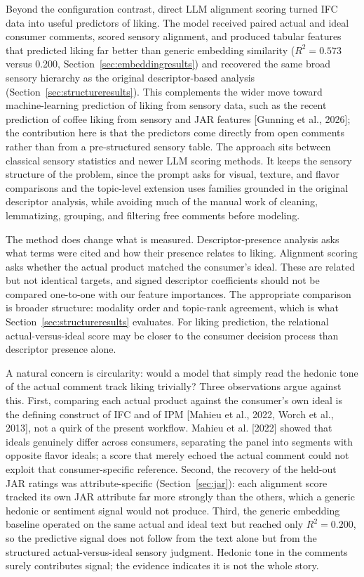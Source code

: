 \documentclass[11pt]{article}
\begin{document}
Beyond the configuration contrast, direct LLM alignment scoring turned IFC
data into useful predictors of liking. The model received paired actual and
ideal consumer comments, scored sensory alignment, and produced tabular
features that predicted liking far better than generic embedding similarity
($R^2 = 0.573$ versus 0.200, Section~\ref{sec:embeddingresults}) and recovered
the same broad sensory hierarchy as the original descriptor-based analysis
(Section~\ref{sec:structureresults}). This complements the wider move toward
machine-learning prediction of liking from sensory data, such as the recent
prediction of coffee liking from sensory and JAR features [Gunning et al.,
2026]; the contribution here is that the predictors come directly from open
comments rather than from a pre-structured sensory table. The approach sits
between classical sensory statistics and newer LLM scoring methods. It keeps
the sensory structure of the problem, since the prompt asks for visual,
texture, and flavor comparisons and the topic-level extension uses families
grounded in the original descriptor analysis, while avoiding much of the
manual work of cleaning, lemmatizing, grouping, and filtering free comments
before modeling.

The method does change what is measured. Descriptor-presence analysis asks
what terms were cited and how their presence relates to liking. Alignment
scoring asks whether the actual product matched the consumer's ideal. These
are related but not identical targets, and signed descriptor coefficients
should not be compared one-to-one with our feature importances. The
appropriate comparison is broader structure: modality order and topic-rank
agreement, which is what Section~\ref{sec:structureresults} evaluates. For
liking prediction, the relational actual-versus-ideal score may be closer to
the consumer decision process than descriptor presence alone.

A natural concern is circularity: would a model that simply read the hedonic
tone of the actual comment track liking trivially? Three observations argue
against this. First, comparing each actual product against the consumer's own
ideal is the defining construct of IFC and of IPM [Mahieu et al., 2022, Worch
et al., 2013], not a quirk of the present workflow. Mahieu et al. [2022]
showed that ideals genuinely differ across consumers, separating the panel
into segments with opposite flavor ideals; a score that merely echoed the
actual comment could not exploit that consumer-specific reference. Second, the
recovery of the held-out JAR ratings was attribute-specific
(Section~\ref{sec:jar}): each alignment score tracked its own JAR attribute
far more strongly than the others, which a generic hedonic or sentiment
signal would not produce. Third, the generic embedding baseline operated on
the same actual and ideal text but reached only $R^2 = 0.200$, so the
predictive signal does not follow from the text alone but from the structured
actual-versus-ideal sensory judgment. Hedonic tone in the comments surely
contributes signal; the evidence indicates it is not the whole story.
\end{document}
